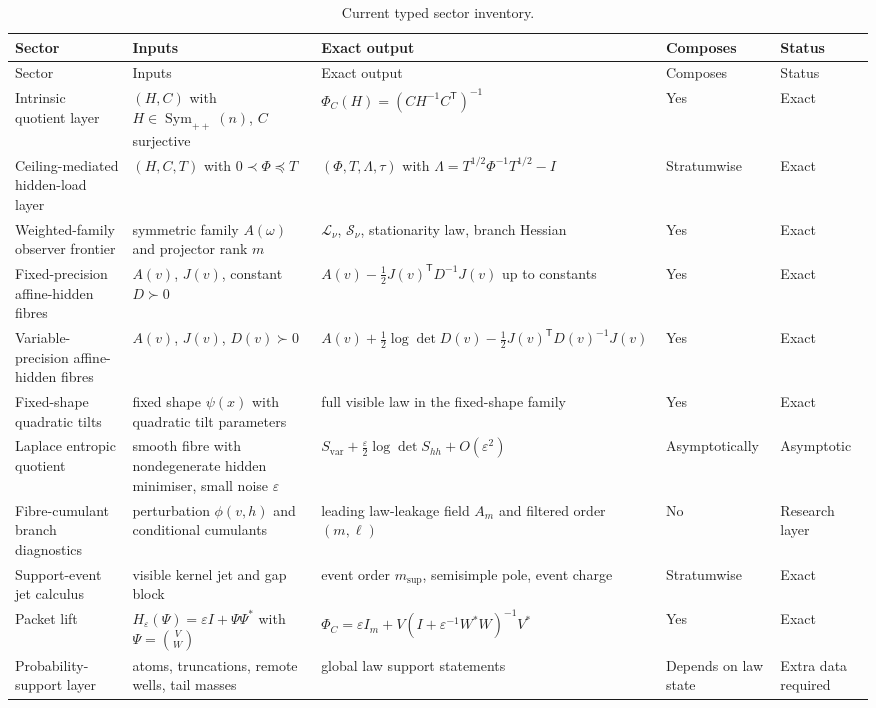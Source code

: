 \documentclass[11pt,a4paper]{article}
\numberwithin{equation}{section}
\DeclareMathOperator{\Sym}{Sym}
\theoremstyle{thmcompact}
\theoremstyle{remark}
\begin{document}
\begin{center}
\small
\begin{longtable}{>{\raggedright\arraybackslash}p{} >{\raggedright\arraybackslash}p{} >{\raggedright\arraybackslash}p{} >{\raggedright\arraybackslash}p{} >{\raggedright\arraybackslash}p{}}
\caption{Current typed sector inventory.}\label{tab:inventory}\\
\toprule
Sector & Inputs & Exact output & Composes & Status \\
\midrule
\endfirsthead
\toprule
Sector & Inputs & Exact output & Composes & Status \\
\midrule
\endhead
Intrinsic quotient layer & $(H,C)$ with $H\in\Sym_{++}(n)$, $C$ surjective & $\Phi_C(H)=(CH^{-1}C^{\mathsf T})^{-1}$ & Yes & Exact \\
Ceiling-mediated hidden-load layer & $(H,C,T)$ with $0\prec \Phi\preceq T$ & $(\Phi,T,\Lambda,\tau)$ with $\Lambda=T^{1/2}\Phi^{-1}T^{1/2}-I$ & Stratumwise & Exact \\
Weighted-family observer frontier & symmetric family $A(\omega)$ and projector rank $m$ & $\mathcal L_\nu$, $\mathcal S_\nu$, stationarity law, branch Hessian & Yes & Exact \\
Fixed-precision affine-hidden fibres & $A(v)$, $J(v)$, constant $D\succ 0$ & $A(v)-\frac12J(v)^{\mathsf T}D^{-1}J(v)$ up to constants & Yes & Exact \\
Variable-precision affine-hidden fibres & $A(v)$, $J(v)$, $D(v)\succ 0$ & $A(v)+\frac12\log\det D(v)-\frac12J(v)^{\mathsf T}D(v)^{-1}J(v)$ & Yes & Exact \\
Fixed-shape quadratic tilts & fixed shape $\psi(x)$ with quadratic tilt parameters & full visible law in the fixed-shape family & Yes & Exact \\
Laplace entropic quotient & smooth fibre with nondegenerate hidden minimiser, small noise $\varepsilon$ & $S_{\mathrm{var}}+\frac{\varepsilon}{2}\log\det S_{hh}+O(\varepsilon^2)$ & Asymptotically & Asymptotic \\
Fibre-cumulant branch diagnostics & perturbation $\phi(v,h)$ and conditional cumulants & leading law-leakage field $A_m$ and filtered order $(m,\ell)$ & No & Research layer \\
Support-event jet calculus & visible kernel jet and gap block & event order $m_{\mathrm{sup}}$, semisimple pole, event charge & Stratumwise & Exact \\
Packet lift & $H_\varepsilon(\Psi)=\varepsilon I+\Psi\Psi^*$ with $\Psi=\binom{V}{W}$ & $\Phi_C=\varepsilon I_m+V(I+\varepsilon^{-1}W^*W)^{-1}V^*$ & Yes & Exact \\
Probability-support layer & atoms, truncations, remote wells, tail masses & global law support statements & Depends on law state & Extra data required \\
\bottomrule
\end{longtable}
\end{center}
\end{document}
